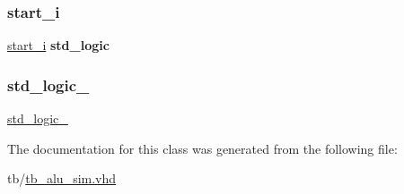 \mbox{\label{classtb__alu_1_1sim_a414f95cbdddc836387d71b48c83730c8}} 
\subsubsection{\texorpdfstring{start\+\_\+i}{start\_i}}
{\footnotesize\ttfamily \hyperlink{classtb__alu_1_1sim_a414f95cbdddc836387d71b48c83730c8}{start\+\_\+i} {\bfseries \textcolor{comment}{std\+\_\+logic}\textcolor{vhdlchar}{ }} \hspace{0.3cm}{\ttfamily [Signal]}}

\mbox{\label{classtb__alu_1_1sim_acd03516902501cd1c7296a98e22c6fcb}} 
\subsubsection{\texorpdfstring{std\+\_\+logic\+\_}{std\_logic\_1164}}
{\footnotesize\ttfamily \hyperlink{classtb__alu_1_1sim_acd03516902501cd1c7296a98e22c6fcb}{std\+\_\+logic\+\_}\hspace{0.3cm}{\ttfamily [Package]}}



The documentation for this class was generated from the following file\+:\begin{DoxyCompactItemize}
\item 
tb/\hyperlink{tb__alu__sim_8vhd}{tb\+\_\+alu\+\_\+sim.\+vhd}\end{DoxyCompactItemize}
